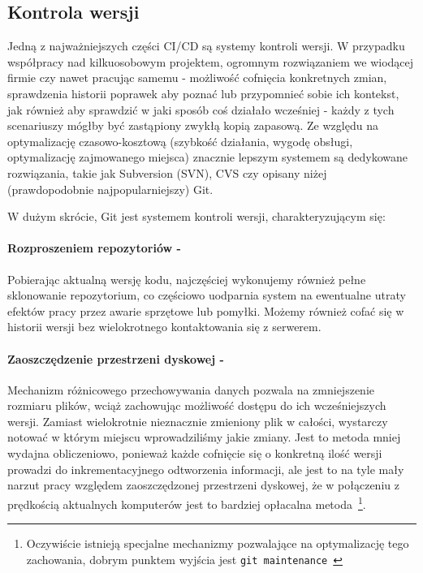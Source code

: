 \subsection{Kontrola wersji}

Jedną z najważniejszych części CI/CD są systemy kontroli wersji. 
W przypadku współpracy nad kilkuosobowym projektem, ogromnym rozwiązaniem 
we wiodącej firmie czy nawet pracując samemu - możliwość cofnięcia konkretnych zmian, 
sprawdzenia historii poprawek aby poznać lub przypomnieć sobie ich kontekst, 
jak również aby sprawdzić w jaki sposób coś działało wcześniej - każdy z tych scenariuszy 
mógłby być zastąpiony zwykłą kopią zapasową. 
Ze względu na optymalizację czasowo-kosztową (szybkość działania, 
wygodę obsługi, optymalizację zajmowanego miejsca) znacznie lepszym systemem są dedykowane 
rozwiązania, takie jak Subversion (SVN), CVS czy opisany niżej (prawdopodobnie najpopularniejszy) Git.

W dużym skrócie, Git jest systemem kontroli wersji, charakteryzującym się:
\paragraph{Rozproszeniem repozytoriów -}
Pobierając aktualną wersję kodu, najczęściej wykonujemy również pełne sklonowanie repozytorium, 
co częściowo uodparnia system na ewentualne utraty efektów pracy przez awarie sprzętowe lub pomyłki.
Możemy również cofać się w historii wersji bez wielokrotnego kontaktowania się z serwerem.

\paragraph{Zaoszczędzenie przestrzeni dyskowej -}
Mechanizm różnicowego przechowywania danych pozwala na zmniejszenie rozmiaru plików, 
wciąż zachowując możliwość dostępu do ich wcześniejszych wersji.
Zamiast wielokrotnie nieznacznie zmieniony plik w całości, wystarczy notować w którym miejscu 
wprowadziliśmy jakie zmiany. Jest to metoda mniej wydajna obliczeniowo, ponieważ każde cofnięcie się 
o konkretną ilość wersji prowadzi do inkrementacyjnego odtworzenia informacji, 
ale jest to na tyle mały narzut pracy względem zaoszczędzonej przestrzeni dyskowej, że w połączeniu 
z prędkością aktualnych komputerów jest to bardziej opłacalna metoda~\cprotect\footnote{%
    Oczywiście istnieją specjalne mechanizmy pozwalające na optymalizację tego zachowania, 
    dobrym punktem wyjścia jest \verb|git maintenance|~\cite{gitMaintenance}}.

